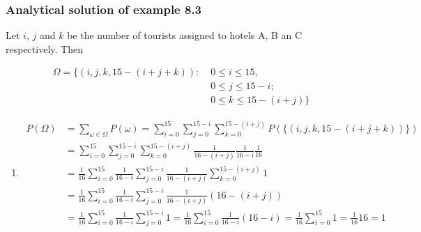 \begin{frame}
    \frametitle{Analytical solution of example 8.3}

    \tiny
    Let $i$, $j$ and $k$ be the number of tourists assigned to hotels A, B an C
    respectively. Then 

    \begin{align*}
        \Omega=\{(i,j,k,15-(i+j+k)):\;&0\le i\le 15,\\
                                      &0\le j\le 15-i;\\
                                      &0\le k\le 15-(i+j)\}
    \end{align*}

    \begin{enumerate}[a]
		\conti
        \item 
            \begin{align*}
				P(\Omega)&=\sum_{\omega\in\Omega}P(\omega)=\sum_{i=0}^{15}\sum_{j=0}^{15-i}\sum_{k=0}^{15-(i+j)}P(\{(i,j,k,15-(i+j+k))\})\\
                         &=\sum_{i=0}^{15}\sum_{j=0}^{15-i}\sum_{k=0}^{15-(i+j)}\frac{1}{16-(i+j)}\frac{1}{16-i}\frac{1}{16}\\
                         &=\frac{1}{16}\sum_{i=0}^{15}\frac{1}{16-i}\sum_{j=0}^{15-i}\frac{1}{16-(i+j)}\sum_{k=0}^{15-(i+j)}1\\
                         &=\frac{1}{16}\sum_{i=0}^{15}\frac{1}{16-i}\sum_{j=0}^{15-i}\frac{1}{16-(i+j)}(16-(i+j))\\
                         &=\frac{1}{16}\sum_{i=0}^{15}\frac{1}{16-i}\sum_{j=0}^{15-i}1=\frac{1}{16}\sum_{i=0}^{15}\frac{1}{16-i}(16-i)=\frac{1}{16}\sum_{i=0}^{15}1=\frac{1}{16}16=1
            \end{align*}
		\seti
    \end{enumerate}
    \normalsize

\end{frame}

